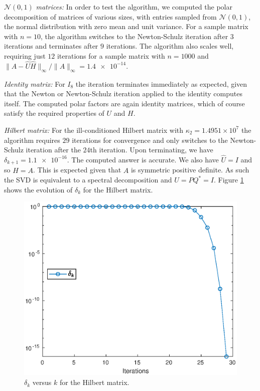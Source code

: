 \documentclass[12pt]{article}
\def\normo#1{\|#1\|_{\infty}}
\begin{document}
$\mathcal{N}(0, 1)$\textit{ matrices:} In order to test the algorithm, we
computed the polar decomposition of matrices of various sizes, with entries
sampled from $\mathcal{N}(0, 1)$, the normal distribution with zero mean and
unit variance. For a sample matrix with $n=10$, the algorithm
switches to the Newton-Schulz iteration after $3$ iterations and terminates
after $9$ iterations.
The algorithm also scales well, requiring just $12$ iterations for a sample
matrix with $n=1000$ and $\normo{A-\hat{U}\hat{H}}/\normo{A} = \num{1.4e-14}$.

\textit{Identity matrix:} For $I_8$ the iteration terminates immediately as
expected, given that the Newton or Newton-Schulz iteration applied to the
identity computes itself. The computed polar factors are again identity
matrices, which of course satisfy the required properties of $U$ and $H$.

\textit{Hilbert matrix:} For the ill-conditioned Hilbert matrix with
$\kappa_2 = 1.4951\times 10^7$ the algorithm requires $29$ iterations for
convergence and only switches to the Newton-Schulz iteration after the $24$th
iteration. Upon terminating, we have $\delta_{k+1} = \num{1.1e-16}$. The
computed answer is accurate. We also have $\hat{U} = I$ and so $\hat{H} = A$.
This is expected given that $A$ is symmetric positive definite.
As such the SVD is equivalent to a spectral decomposition and $U = PQ^* = I$.
Figure \ref{fig:hilb} shows the evolution of $\delta_k$ for the Hilbert matrix. 
\begin{figure}
  \centering
  \includegraphics[scale=0.8]{hilb}
  \caption{$\delta_k$ versus $k$ for the Hilbert matrix.}
  \label{fig:hilb}    
\end{figure}
\end{document}
